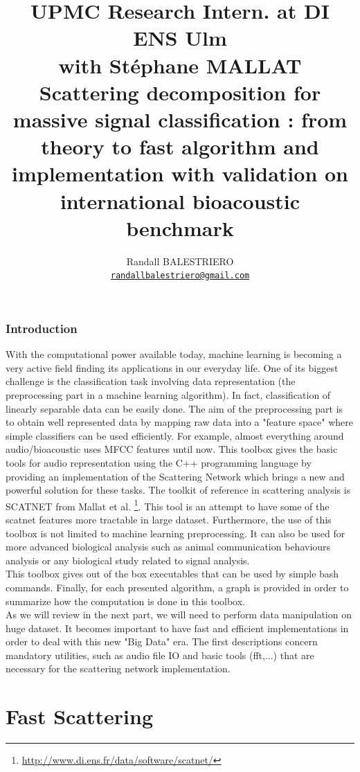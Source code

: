 \documentclass[a4paper]{report}
\title{UPMC Research Intern. at DI ENS Ulm\\ with St\'ephane MALLAT\\Scattering decomposition for massive signal classification :
from theory to fast algorithm and implementation with validation on
international bioacoustic benchmark}
\author{Randall BALESTRIERO\\
\texttt{\url{randallbalestriero@gmail.com}}}
\affil{Pierre et Marie Curie University, Paris 6}
\date{}
\begin{document}
\maketitle


\newpage

\tableofcontents
\newpage
\section{Introduction}

With the computational power available today, machine learning is becoming a very active field finding its applications in our everyday life. One of its biggest challenge is the classification task involving data representation (the preprocessing part in a machine learning algorithm). In fact, classification of linearly separable data can be easily done. The aim of the preprocessing part is to obtain well represented data by mapping raw data into a "feature space" where simple classifiers can be used efficiently.
For example, almost everything around audio/bioacoustic uses MFCC features until now.
This toolbox gives the basic tools for audio representation using the C++ programming language by providing an implementation of the Scattering Network \cite{m3} which brings a new and powerful solution for these tasks. 
The toolkit of reference in scattering analysis is SCATNET from Mallat et al. \footnote{\url{http://www.di.ens.fr/data/software/scatnet/}}. This
tool is an attempt to have some of the scatnet features more
tractable in large dataset.
Furthermore, the use of this toolbox is not limited to machine learning preprocessing. It can also be used for more advanced biological analysis such as animal communication behaviours analysis or any biological study related to signal analysis.\\
This toolbox gives out of the box executables that can be used by simple bash commands. Finally, for each presented algorithm, a graph is provided in order to summarize how the computation is done in this toolbox.\\

As we will review in the next part, we will need to perform data manipulation on huge dataset. It becomes important to have fast and efficient implementations in order to deal with this new "Big Data" era. The first descriptions concern mandatory utilities, such as audio file IO and basic tools (fft,...) that are necessary for the scattering network implementation.

\part{Fast Scattering}
\end{document}
